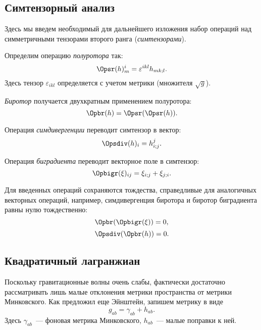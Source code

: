 \documentclass[\docroot/reports/draft/report.tex]{subfiles}
\begin{document}
\onlyinsubfile{\tableofcontents}

\subsection{Симтензорный анализ}

    Здесь мы введем необходимый для дальнейшего изложения набор операций над симметричными тензорами второго ранга (\textit{симтензорами}).

    Определим операцию \textit{полуротора} так:
    \begin{equation}\label{eq:sr}
        \Opsr(h)^i_m = \varepsilon^{ikl} h_{mk;l} .
    \end{equation}
    Здесь тензор $\varepsilon_{ikl}$ определяется с учетом метрики (множителя $\sqrt{g}$).

    \textit{Биротор} получается двухкратным применением полуротора:
    \begin{equation}\label{eq:br}
        \Opbr(h) = \Opsr(\Opsr(h)) .
    \end{equation}

    Операция \textit{симдивергенции} переводит симтензор в вектор:
    \begin{equation}\label{eq:sdiv}
        \Opsdiv(h)_i = h^j_{i;j} .
    \end{equation}

    Операция \textit{биградиента} переводит векторное поле в симтензор:
    \begin{equation}\label{eq:bigr}
        \Opbigr(\xi)_{ij} = \xi_{i;j} + \xi_{j;i}.
    \end{equation}

    Для введенных операций сохраняются тождества, справедливые для аналогичных векторных операций, например, симдивергенция биротора и биротор биградиента равны нулю тождественно:
    \begin{equation}\label{eq:br-of-bigr}
        \Opbr(\Opbigr(\xi)) = 0,
    \end{equation}
    \begin{equation}\label{eq:sdiv-of-br}
        \Opsdiv(\Opbr(h)) = 0.
    \end{equation}

\subsection{Квадратичный лагранжиан}

    Поскольку гравитационные волны очень слабы, фактически достаточно рассматривать лишь малые отклонения метрики пространства от метрики Минковского. Как предложил еще Эйнштейн, запишем метрику в виде
    \begin{equation}\label{eq:gab}
        g_{ab} = \gamma_{ab} + h_{ab} .
    \end{equation}
    Здесь $\gamma_{ab}$~--- фоновая метрика Минковского, $h_{ab}$~--- малые поправки к ней.
\end{document}
